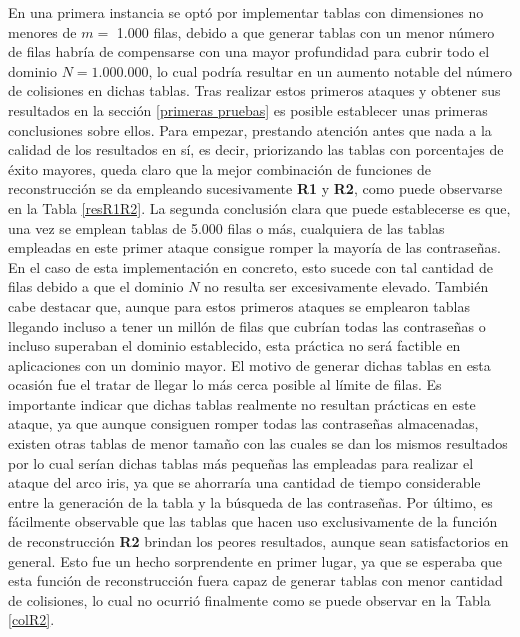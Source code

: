 \documentclass[12pt,spanish,listoffigures,listoftables]{tfgetsinf}
\begin{document}
En una primera instancia se optó por implementar tablas con dimensiones no menores de $m =$ 1.000 filas, debido a que generar tablas con un menor número de filas habría de compensarse con una mayor profundidad para cubrir todo el dominio $N = 1.000.000$, lo cual podría resultar en un aumento notable del número de colisiones en dichas tablas. Tras realizar estos primeros ataques y obtener sus resultados en la sección \ref{primeras pruebas} es posible establecer unas primeras conclusiones sobre ellos. Para empezar, prestando atención antes que nada a la calidad de los resultados en sí, es decir, priorizando las tablas con porcentajes de éxito mayores, queda claro que la mejor combinación de funciones de reconstrucción se da empleando sucesivamente \textbf{R1} y \textbf{R2}, como puede observarse en la Tabla \ref{resR1R2}. La segunda conclusión clara que puede establecerse es que, una vez se emplean tablas de 5.000 filas o más, cualquiera de las tablas empleadas en este primer ataque consigue romper la mayoría de las contraseñas. En el caso de esta implementación en concreto, esto sucede con tal cantidad de filas debido a que el dominio $N$ no resulta ser excesivamente elevado. También cabe destacar que, aunque para estos primeros ataques se emplearon tablas llegando incluso a tener un millón de filas que cubrían todas las contraseñas o incluso superaban el dominio establecido, esta práctica no será factible en aplicaciones con un dominio mayor. El motivo de generar dichas tablas en esta ocasión fue el tratar de llegar lo más cerca posible al límite de filas. Es importante indicar que dichas tablas realmente no resultan prácticas en este ataque, ya que aunque consiguen romper todas las contraseñas almacenadas, existen otras tablas de menor tamaño con las cuales se dan los mismos resultados por lo cual serían dichas tablas más pequeñas las empleadas para realizar el ataque del arco iris, ya que se ahorraría una cantidad de tiempo considerable entre la generación de la tabla y la búsqueda de las contraseñas. Por último, es fácilmente observable que las tablas que hacen uso exclusivamente de la función de reconstrucción \textbf{R2} brindan los peores resultados, aunque sean satisfactorios en general. Esto fue un hecho sorprendente en primer lugar, ya que se esperaba que esta función de reconstrucción fuera capaz de generar tablas con menor cantidad de colisiones, lo cual no ocurrió finalmente como se puede observar en la Tabla \ref{colR2}.
\end{document}
